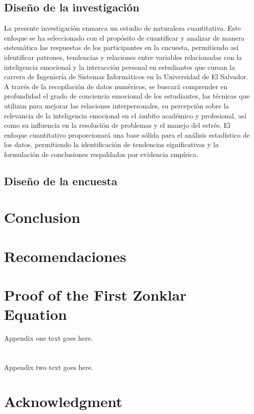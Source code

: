 \documentclass[journal]{IEEEtran}
\begin{document}
\subsection{Diseño de la investigación}
La presente investigación enmarca un estudio de naturaleza cuantitativa. Este enfoque se ha seleccionado con el propósito de cuantificar y analizar de manera sistemática las respuestas de los participantes en la encuesta, permitiendo así identificar patrones, tendencias y relaciones entre variables relacionadas con la inteligencia emocional y la interacción personal en estudiantes que cursan la carrera de Ingeniería de Sistemas Informáticos en la Universidad de El Salvador. A través de la recopilación de datos numéricos, se buscará comprender en profundidad el grado de conciencia emocional de los estudiantes, las técnicas que utilizan para mejorar las relaciones interpersonales, su percepción sobre la relevancia de la inteligencia emocional en el ámbito académico y profesional, así como su influencia en la resolución de problemas y el manejo del estrés. El enfoque cuantitativo proporcionará una base sólida para el análisis estadístico de los datos, permitiendo la identificación de tendencias significativas y la formulación de conclusiones respaldadas por evidencia empírica.
\subsection{Diseño de la encuesta}

\section{Conclusion}

\section{Recomendaciones}

\appendices
\section{Proof of the First Zonklar Equation}
Appendix one text goes here.

\section{}
Appendix two text goes here.

\section*{Acknowledgment}
\end{document}
